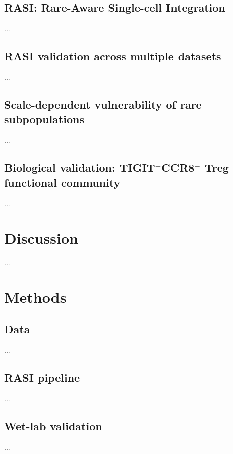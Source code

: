 \documentclass[10pt]{article}
\begin{document}
\subsection{RASI: Rare-Aware Single-cell Integration}
...

\subsection{RASI validation across multiple datasets}
...

\subsection{Scale-dependent vulnerability of rare subpopulations}
...

\subsection{Biological validation: TIGIT$^+$CCR8$^-$ Treg functional community}
...

\section{Discussion}
...




\section{Methods}

\subsection{Data}
...

\subsection{RASI pipeline}
...

\subsection{Wet-lab validation}
...
\end{document}
